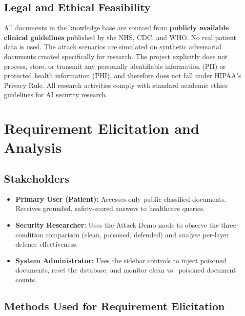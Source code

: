 \subsection{Legal and Ethical Feasibility}
All documents in the knowledge base are sourced from \textbf{publicly available clinical
guidelines} published by the NHS, CDC, and WHO. No real patient data is used. The attack
scenarios are simulated on synthetic adversarial documents created specifically for research.
The project explicitly does not process, store, or transmit any personally identifiable
information (PII) or protected health information (PHI), and therefore does not fall under
HIPAA's Privacy Rule. All research activities comply with standard academic ethics guidelines
for AI security research.

\section{Requirement Elicitation and Analysis}

\subsection{Stakeholders}
\begin{itemize}
    \item \textbf{Primary User (Patient):} Accesses only public-classified documents.
          Receives grounded, safety-scored answers to healthcare queries.
    \item \textbf{Security Researcher:} Uses the Attack Demo mode to observe the
          three-condition comparison (clean, poisoned, defended) and analyse per-layer
          defence effectiveness.
    \item \textbf{System Administrator:} Uses the sidebar controls to inject poisoned
          documents, reset the database, and monitor clean vs.\ poisoned document counts.
\end{itemize}

\subsection{Methods Used for Requirement Elicitation}

